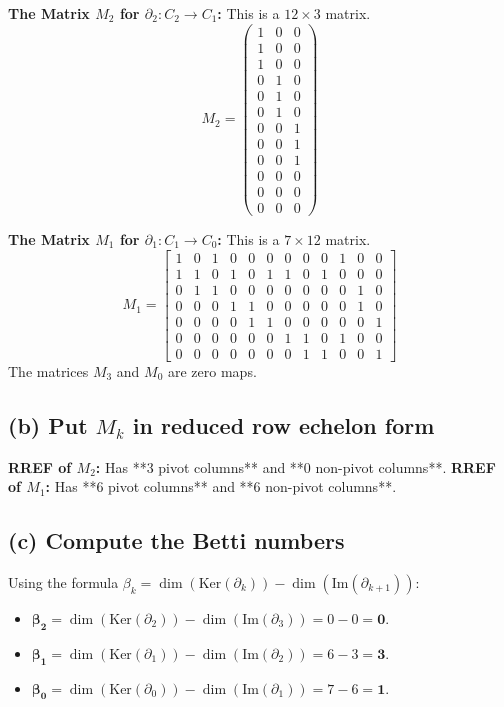 \documentclass{article}
\begin{document}
\textbf{The Matrix $M_2$ for $\partial_2: C_2 \to C_1$:}
This is a $12 \times 3$ matrix.
$$ M_2 = \begin{pmatrix} 1&0&0\\ 1&0&0\\ 1&0&0\\ 0&1&0\\ 0&1&0\\ 0&1&0\\ 0&0&1\\ 0&0&1\\ 0&0&1\\ 0&0&0\\ 0&0&0\\ 0&0&0 \end{pmatrix} $$

\textbf{The Matrix $M_1$ for $\partial_1: C_1 \to C_0$:}
This is a $7 \times 12$ matrix.
$$
M_1 = \left[\begin{array}{cccccccccccc}
    1 & 0 & 1 & 0 & 0 & 0 & 0 & 0 & 0 & 1 & 0 & 0 \\
    1 & 1 & 0 & 1 & 0 & 1 & 1 & 0 & 1 & 0 & 0 & 0 \\
    0 & 1 & 1 & 0 & 0 & 0 & 0 & 0 & 0 & 0 & 1 & 0 \\
    0 & 0 & 0 & 1 & 1 & 0 & 0 & 0 & 0 & 0 & 1 & 0 \\
    0 & 0 & 0 & 0 & 1 & 1 & 0 & 0 & 0 & 0 & 0 & 1 \\
    0 & 0 & 0 & 0 & 0 & 0 & 1 & 1 & 0 & 1 & 0 & 0 \\
    0 & 0 & 0 & 0 & 0 & 0 & 0 & 1 & 1 & 0 & 0 & 1
\end{array}\right]
$$
The matrices $M_3$ and $M_0$ are zero maps.

\subsection*{(b) Put $M_k$ in reduced row echelon form}
\textbf{RREF of $M_2$:} Has **3 pivot columns** and **0 non-pivot columns**.
\textbf{RREF of $M_1$:} Has **6 pivot columns** and **6 non-pivot columns**.

\subsection*{(c) Compute the Betti numbers}
Using the formula $\beta_k = \dim(\text{Ker}(\partial_k)) - \dim(\text{Im}(\partial_{k+1}))$:
\begin{itemize}
    \item $\boldsymbol{\beta_2} = \dim(\text{Ker}(\partial_2)) - \dim(\text{Im}(\partial_3)) = 0 - 0 = \mathbf{0}$.
    \item $\boldsymbol{\beta_1} = \dim(\text{Ker}(\partial_1)) - \dim(\text{Im}(\partial_2)) = 6 - 3 = \mathbf{3}$.
    \item $\boldsymbol{\beta_0} = \dim(\text{Ker}(\partial_0)) - \dim(\text{Im}(\partial_1)) = 7 - 6 = \mathbf{1}$.
\end{itemize}
\end{document}
